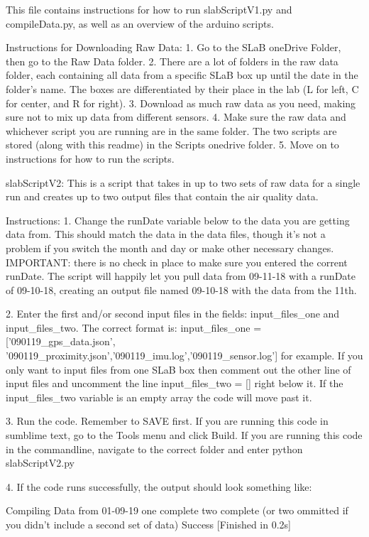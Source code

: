 This file contains instructions for how to run slabScriptV1.py and compileData.py, as well as an overview of the arduino scripts. 

Instructions for Downloading Raw Data:
1. Go to the SLaB oneDrive Folder, then go to the Raw Data folder.
2. There are a lot of folders in the raw data folder, each containing all data from a specific SLaB box up until the date in the folder's name. The boxes are differentiated by their place in the lab (L for left, C for center, and R for right).
3. Download as much raw data as you need, making sure not to mix up data from different sensors. 
4. Make sure the raw data and whichever script you are running are in the same folder. The two scripts are stored (along with this readme) in the Scripts onedrive folder.
5. Move on to instructions for how to run the scripts. 

slabScriptV2: 
This is a script that takes in up to two sets of raw data for a single run and creates up to two output files that contain the air quality data. 


Instructions:
   1. Change the runDate variable below to the data you are getting data from. This should match
      the data in the data files, though it's not a problem if you switch the month and day or make
     other necessary changes. IMPORTANT: there is no check in place to make sure you entered the corrent
      runDate. The script will happily let you pull data from 09-11-18 with a runDate of 09-10-18,
      creating an output file named 09-10-18 with the data from the 11th. 

   2. Enter the first and/or second input files in the fields: input_files_one and input_files_two. The correct
      format is: input_files_one = ['090119_gps_data.json', '090119_proximity.json','090119_imu.log','090119_sensor.log']
      for example. If you only want to input files from one SLaB box then comment out the other line of input files
      and uncomment the line input_files_two = [] right below it. If the input_files_two variable is an empty array
      the code will move past it. 

   3. Run the code. Remember to SAVE first. If you are running this code in sumblime text, go to the Tools menu and
      click Build. If you are running this code in the commandline, navigate to the correct folder and enter
      python slabScriptV2.py

   4. If the code runs successfully, the output should look something like:

            Compiling Data from 01-09-19
            one complete
            two complete (or two ommitted if you didn't include a second set of data)
            Success
            [Finished in 0.2s]

